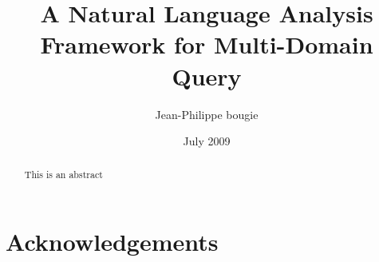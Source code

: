 \documentclass[a4paper]{report}
\begin{document}
\onehalfspacing

\title{A Natural Language Analysis Framework for Multi-Domain Query}
\author{Jean-Philippe bougie}
\date{July 2009}

\maketitle

\tableofcontents
\listoffigures
\listoftables

\chapter*{Acknowledgements}

\begin{abstract}
  This is an abstract
\end{abstract}














\end{document}

